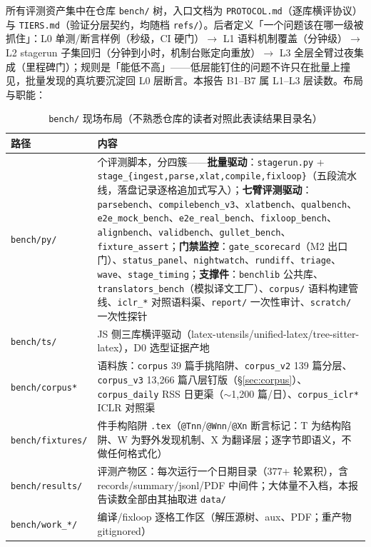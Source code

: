 所有评测资产集中在仓库 \texttt{bench/} 树，入口文档为 \texttt{PROTOCOL.md}（逐库横评协议）与 \texttt{TIERS.md}（验证分层契约，均随档 \texttt{refs/}）。后者定义「一个问题该在哪一级被抓住」：L0 单测/断言样例（秒级，CI 硬门）$\to$ L1 语料机制覆盖（分钟级）$\to$ L2 stagerun 子集回归（分钟到小时，机制台账定向重放）$\to$ L3 全层全臂过夜集成（里程碑门）；规则是「能低不高」——低层能钉住的问题不许只在批量上撞见，批量发现的真坑要沉淀回 L0 层断言。本报告 B1--B7 属 L1--L3 层读数。布局与职能：

\begin{table}[htbp]
\centering\small
\caption{\texttt{bench/} 现场布局（不熟悉仓库的读者对照此表读结果目录名）}
\label{tab:benchlayout}
\begin{tabular}{@{}l>{\raggedright\arraybackslash}p{10.8cm}@{}}
\toprule
路径 & 内容 \\
\midrule
\texttt{bench/py/} & 37 个评测脚本，分四簇——\textbf{批量驱动}：\texttt{stagerun.py} + \texttt{stage\_\{ingest,parse,xlat,compile,fixloop\}}（五段流水线，落盘记录逐格追加式写入）；\textbf{七臂评测驱动}：\texttt{parsebench}、\texttt{compilebench\_v3}、\texttt{xlatbench}、\texttt{qualbench}、\texttt{e2e\_mock\_bench}、\texttt{e2e\_real\_bench}、\texttt{fixloop\_bench}、\texttt{alignbench}、\texttt{validbench}、\texttt{gullet\_bench}、\texttt{fixture\_assert}；\textbf{门禁监控}：\texttt{gate\_scorecard}（M2 出口门）、\texttt{status\_panel}、\texttt{nightwatch}、\texttt{rundiff}、\texttt{triage}、\texttt{wave}、\texttt{stage\_timing}；\textbf{支撑件}：\texttt{benchlib} 公共库、\texttt{translators\_bench}（模拟译文工厂）、\texttt{corpus/} 语料构建管线、\texttt{iclr\_*} 对照语料渠、\texttt{report/} 一次性审计、\texttt{scratch/} 一次性探针 \\
\texttt{bench/ts/} & JS 侧三库横评驱动（latex-utensils/unified-latex/tree-sitter-latex），D0 选型证据产地 \\
\texttt{bench/corpus*} & 语料族：\texttt{corpus} 39 篇手挑陷阱、\texttt{corpus\_v2} 139 篇分层、\texttt{corpus\_v3} 13{,}266 篇八层钉版（\S\ref{sec:corpus}）、\texttt{corpus\_daily} RSS 日更渠（$\sim$1{,}200 篇/日）、\texttt{corpus\_iclr*} ICLR 对照渠 \\
\texttt{bench/fixtures/} & 10 件手构陷阱 \texttt{.tex}（\texttt{@Tnn}/\texttt{@Wnn}/\texttt{@Xn} 断言标记：T 为结构陷阱、W 为野外发现机制、X 为翻译层；逐字节即语义，不做任何格式化） \\
\texttt{bench/results/} & 评测产物区：每次运行一个日期目录（377+ 轮累积），含 records/summary/jsonl/PDF 中间件；大体量不入档，本报告读数全部由其抽取进 \texttt{data/} \\
\texttt{bench/work\_*/} & 编译/fixloop 逐格工作区（解压源树、aux、PDF；重产物 gitignored） \\
\bottomrule
\end{tabular}
\end{table}

